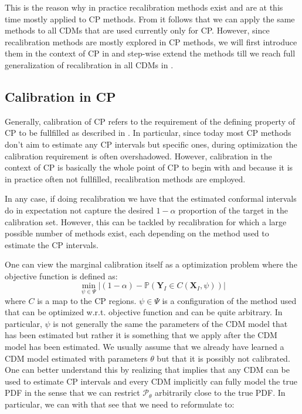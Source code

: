 This is the reason why in practice recalibration methods exist and are at this time mostly applied to CP methods. From  it follows that we can apply the same methods to all CDMs that are used currently only for CP. However, since recalibration methods are mostly explored in CP methods, we will first introduce them in the context of CP in  and step-wise extend the methods till we reach full generalization of recalibration in all CDMs in .

\subsection{Calibration in CP}\label{sec:calibration_cp}
Generally, calibration of CP refers to the requirement of the defining property of CP to be fullfilled as described in . In particular, since today most CP methods don't aim to estimate any CP intervals but specific ones, during optimization the calibration requirement is often overshadowed. However, calibration in the context of CP is basically the whole point of CP to begin with and because it is in practice often not fullfilled, recalibration methods are employed.

In any case, if doing recalibration we have that the estimated conformal intervals do in expectation not capture the desired $1 - \alpha$ proportion of the target in the calibration set. However, this can be tackled by recalibration for which a large possible number of methods exist, each depending on the method used to estimate the CP intervals.

One can view the marginal calibration itself as a optimization problem where the objective function is defined as:
\begin{equation}
    \min_{\psi \in \Psi} |(1 - \alpha) - \mathbb{P}(\mathbf{Y}_I \in C(\mathbf{X}_I, \psi))|
    \label{eq:calibration_objective}
\end{equation}
where $C$ is a map to the CP regions. $\psi\in\Psi$ is a configuration of the method used that can be optimized w.r.t. objective function and can be quite arbitrary. In particular, $\psi$ is not generally the same the parameters of the CDM model that has been estimated but rather it is something that we apply after the CDM model has been estimated. We usually assume that we already have learned a CDM model estimated with parameters $\theta$ but that it is possibly not calibrated. One can better understand this by realizing that  implies that any CDM can be used to estimate CP intervals and every CDM implicitly can fully model the true PDF in the sense that we can restrict $\mathscr{P}_{\theta}$ arbitrarily close to the true PDF. In particular, we can with that see that we need to reformulate  to:

